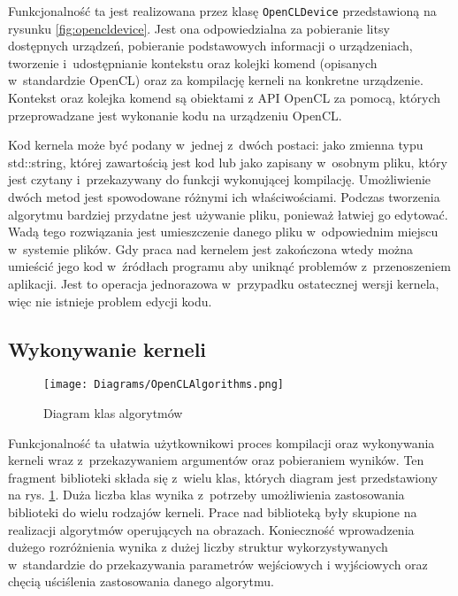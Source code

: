 Funkcjonalność ta jest realizowana przez klasę \texttt{OpenCLDevice} przedstawioną na rysunku \ref{fig:opencldevice}. Jest ona odpowiedzialna za pobieranie litsy dostępnych urządzeń, pobieranie podstawowych informacji o urządzeniach, tworzenie i~udostępnianie kontekstu oraz kolejki komend (opisanych w~standardzie OpenCL) oraz za kompilację kerneli na konkretne urządzenie. Kontekst oraz kolejka komend są obiektami z API OpenCL za pomocą, których przeprowadzane jest wykonanie kodu na urządzeniu OpenCL.

Kod kernela może być podany w~jednej z~dwóch postaci: jako zmienna typu std::string, której zawartością jest kod lub jako zapisany w~osobnym pliku, który jest czytany i~przekazywany do funkcji wykonującej kompilację. Umożliwienie dwóch metod jest spowodowane różnymi ich właściwościami. Podczas tworzenia algorytmu bardziej przydatne jest używanie pliku, ponieważ łatwiej go edytować.  Wadą tego rozwiązania jest umieszczenie danego pliku w~odpowiednim miejscu w~systemie plików. Gdy praca nad kernelem jest zakończona wtedy można umieścić jego kod w~źródłach programu aby uniknąć problemów z~przenoszeniem aplikacji. Jest to operacja jednorazowa w~przypadku ostatecznej wersji kernela, więc nie istnieje problem edycji kodu.

\subsection{Wykonywanie kerneli}
\label{subsec:wykonywaniekerneli}

\begin{figure}
\begin{center}
\texttt{[image: Diagrams/OpenCLAlgorithms.png]}
\end{center}
\caption{Diagram klas algorytmów}
\label{fig:openclalgorithms}
\end{figure}

Funkcjonalność ta ułatwia użytkownikowi proces kompilacji oraz wykonywania kerneli wraz z~przekazywaniem argumentów oraz pobieraniem wyników. Ten fragment biblioteki składa się z~wielu klas, których diagram jest przedstawiony na rys. \ref{fig:openclalgorithms}. Duża liczba klas wynika z~potrzeby umożliwienia zastosowania biblioteki do wielu rodzajów kerneli. Prace nad biblioteką były skupione na realizacji algorytmów operujących na obrazach. Konieczność wprowadzenia dużego rozróżnienia wynika z dużej liczby struktur wykorzystywanych w~standardzie do przekazywania parametrów wejściowych i wyjściowych oraz chęcią uściślenia zastosowania danego algorytmu.

